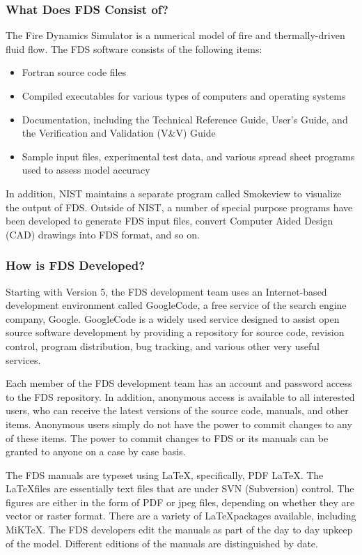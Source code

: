 \documentclass[11pt]{book}
\begin{document}
\subsubsection{What Does FDS Consist of?}

The Fire Dynamics Simulator is a numerical model of fire and thermally-driven fluid flow. The FDS software consists of the following
items:
\begin{itemize}
\item Fortran source code files
\item Compiled executables for various types of computers and operating systems
\item Documentation, including the Technical Reference Guide, User's Guide, and the Verification and Validation (V\&V) Guide
\item Sample input files, experimental test data, and various spread sheet programs used to assess model accuracy
\end{itemize}
In addition, NIST maintains a separate program called Smokeview to visualize the output of FDS. Outside of NIST, a number of
special purpose programs have been developed to generate FDS input files, convert Computer Aided Design (CAD) drawings into FDS
format, and so on.


\subsubsection{How is FDS Developed?}

Starting with Version 5, the FDS development team uses
an Internet-based development
environment called GoogleCode, a free service of the search engine company, Google. GoogleCode is a widely used service designed to assist
open source software development by providing a repository for source
code, revision control, program distribution, bug tracking, and
various other very useful services.

Each member of the FDS development team has an account and password
access to the FDS repository. In
addition, anonymous access is available to all interested users, who
can receive the latest versions of the source code, manuals, and other
items. Anonymous users simply do not have the power to commit changes
to any of these items. The power to commit changes to FDS or its
manuals can be granted to anyone on a case by case basis.

The FDS manuals are typeset using \LaTeX, specifically, PDF \LaTeX. The \LaTeX files are essentially text files that are under
SVN (Subversion) control. The figures are either in the form of PDF or jpeg files, depending on whether they are vector or
raster format. There are a variety of \LaTeX packages available, including MiKTeX. The FDS developers edit the manuals as part of the
day to day upkeep of the model. Different editions of the manuals are distinguished by date.
\end{document}
